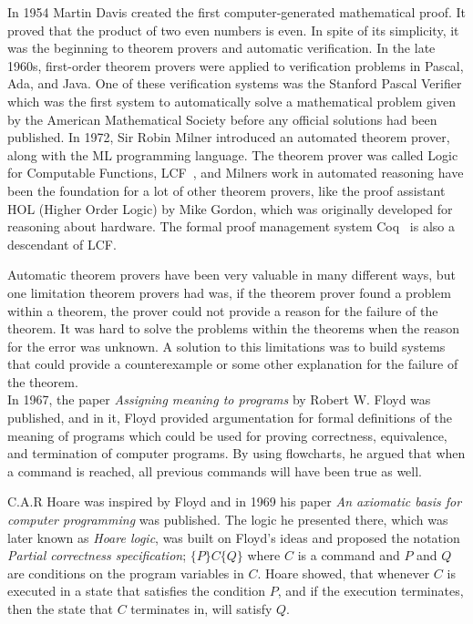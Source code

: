 In 1954 Martin Davis created the first computer-generated mathematical proof. It proved that the product of two even numbers is even. In spite of its simplicity, it was the beginning to theorem provers and automatic verification.
In the late 1960s, first-order theorem provers were applied to verification problems in Pascal, Ada, and Java. One of these verification systems was the Stanford Pascal Verifier\cite{Luckham1979} which was the first system to automatically solve a mathematical problem given by the American Mathematical Society before any official solutions had been published.
In 1972, Sir Robin Milner introduced an automated theorem prover, along with the ML programming language. The theorem prover was called Logic for Computable Functions, LCF~\cite{Milner1972}, and Milners work in automated reasoning have been the foundation for a lot of other theorem provers, like the proof assistant HOL (Higher Order Logic) by Mike Gordon, which was originally developed for reasoning about hardware. The formal proof management system Coq~\cite{coq} is also a descendant of LCF.

Automatic theorem provers have been very valuable in many different ways, but one limitation theorem provers had was, if the theorem prover found a problem within a theorem, the prover could not provide a reason for the failure of the theorem. It was hard to solve the problems within the theorems when the reason for the error was unknown. A solution to this limitations was to build systems that could provide a counterexample or some other explanation for the failure of the theorem. \\

In 1967, the paper \textit{Assigning meaning to programs}\cite{Floyd1967} by Robert W. Floyd was published, and in it, Floyd provided argumentation for formal definitions of the meaning of programs which could be used for proving correctness, equivalence, and termination of computer programs. By using flowcharts, he argued that when a command is reached, all previous commands will have been true as well.

C.A.R Hoare was inspired by Floyd and in 1969 his paper \textit{An axiomatic basis for computer programming}\cite{Hoare1969} was published. The logic he presented there, which was later known as \textit{Hoare logic}, was built on Floyd's ideas and proposed the notation \textit{Partial correctness specification}; $\{P\} C \{Q\}$ where $C$ is a command and $P$ and $Q$ are conditions on the program variables in $C$. Hoare showed, that whenever $C$ is executed in a state that satisfies the condition $P$, and if the execution terminates, then the state that $C$ terminates in, will satisfy $Q$.

